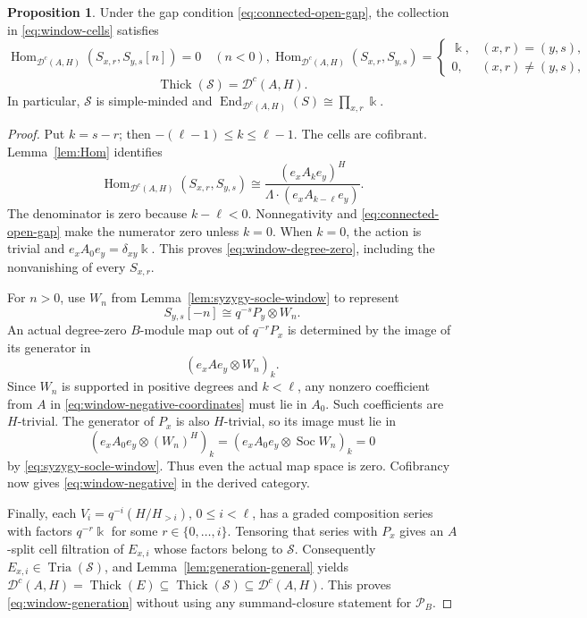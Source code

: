 \documentclass[11pt]{article}
\theoremstyle{definition}
\newtheorem{prop}[thm]{Proposition}
\numberwithin{equation}{section}
\newcommand{\kk}{\Bbbk}
\newcommand{\Pun}{\mathcal{P}_B}
\newcommand{\Dc}{\mathcal{D}^c(A,H)}
\newcommand{\Hom}{\operatorname{Hom}}
\newcommand{\End}{\operatorname{End}}
\newcommand{\tria}{\operatorname{Tria}}
\newcommand{\thick}{\operatorname{Thick}}
\newcommand{\Soc}{\operatorname{Soc}}
\begin{document}
\begin{prop}\label{prop:window-simple-minded}
Under the gap condition \eqref{eq:connected-open-gap}, the collection in
\eqref{eq:window-cells} satisfies
\begin{subequations}
\begin{equation}
 \Hom_{\Dc}(S_{x,r},S_{y,s}[n])=0 \quad (n<0),
 \label{eq:window-negative}
 \end{equation}
 \begin{equation}
 \Hom_{\Dc}(S_{x,r},S_{y,s}) =
 \begin{cases}\kk,&(x,r)=(y,s),\\0,&(x,r)\ne(y,s),\end{cases}
 \label{eq:window-degree-zero}
 \end{equation}
 \end{subequations}
 \begin{equation}
 \thick(\mathcal S) =\Dc.
 \label{eq:window-generation}
\end{equation}
In particular, $\mathcal S$ is simple-minded and
$\End_{\Dc}(S)\cong\prod_{x,r}\kk$.
\end{prop}
\begin{proof}
Put $k=s-r$; then $-(\ell-1)\le k\le\ell-1$.
The cells are cofibrant.  Lemma~\ref{lem:Hom} identifies
\begin{equation}\label{eq:window-Hom0-formula}
 \Hom_{\Dc}(S_{x,r},S_{y,s})
 \cong
 \frac{(e_xA_k e_y)^H}
 {\Lambda\cdot(e_xA_{k-\ell}e_y)}.
\end{equation}
The denominator is zero because $k-\ell<0$.  Nonnegativity and
\eqref{eq:connected-open-gap} make the numerator zero unless $k=0$.
When $k=0$, the action is trivial and
$e_xA_0e_y=\delta_{xy}\kk$.  This proves
\eqref{eq:window-degree-zero}, including the nonvanishing of every
$S_{x,r}$.

For $n>0$, use $W_n$ from Lemma~\ref{lem:syzygy-socle-window} to
represent
\[
 S_{y,s}[-n]\cong q^{-s}P_y\otimes W_n.
\]
An actual degree-zero $B$-module map out of $q^{-r}P_x$ is determined
by the image of its generator in
\begin{equation}\label{eq:window-negative-coordinates}
 (e_xAe_y\otimes W_n)_k.
\end{equation}
Since $W_n$ is supported in positive degrees and $k<\ell$, any
nonzero coefficient from $A$ in \eqref{eq:window-negative-coordinates}
must lie in $A_0$.  Such coefficients are $H$-trivial.  The generator
of $P_x$ is also $H$-trivial, so its image must lie in
\[
 (e_xA_0e_y\otimes(W_n)^H)_k
 =(e_xA_0e_y\otimes\Soc W_n)_k=0
\]
by \eqref{eq:syzygy-socle-window}.  Thus even the actual map space
is zero.  Cofibrancy now gives \eqref{eq:window-negative} in the
derived category.

Finally, each $V_i=q^{-i}(H/H_{>i})$, $0\le i<\ell$, has a graded
composition series with factors $q^{-r}\kk$ for some $r\in \{0,\dots, i\}$.
Tensoring that series with $P_x$ gives an $A$-split cell filtration
of $E_{x,i}$ whose factors belong to $\mathcal S$.
Consequently $E_{x,i}\in\tria(\mathcal S)$, and
Lemma~\ref{lem:generation-general} yields
$\Dc=\thick(E)\subseteq\thick(\mathcal S)\subseteq\Dc$.
This proves \eqref{eq:window-generation} without using any
summand-closure statement for $\Pun$.
\end{proof}
\end{document}
